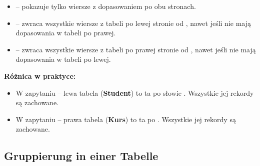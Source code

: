 \begin{tcolorbox}[gray={Opis}]
\begin{itemize}
    \item {} – pokazuje tylko wiersze z dopasowaniem po obu stronach.
    \item {} – zwraca wszystkie wiersze z tabeli po lewej stronie od , nawet jeśli nie mają dopasowania w tabeli po prawej.
    \item {} – zwraca wszystkie wiersze z tabeli po prawej stronie od , nawet jeśli nie mają dopasowania w tabeli po lewej.
\end{itemize}
\end{tcolorbox}

\textbf{Różnica w praktyce:}
\begin{itemize}
    \item W zapytaniu  – lewa tabela (\textbf{Student}) to ta po słowie . Wszystkie jej rekordy są zachowane.
    \item W zapytaniu  – prawa tabela (\textbf{Kurs}) to ta po . Wszystkie jej rekordy są zachowane.
\end{itemize}

\subsection{Gruppierung in einer Tabelle}

